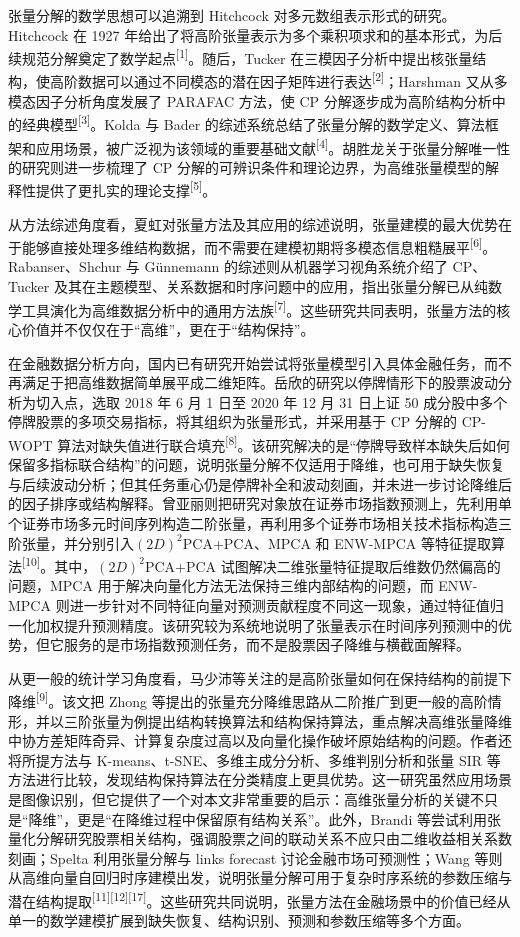 张量分解的数学思想可以追溯到 Hitchcock 对多元数组表示形式的研究。Hitchcock 在 1927 年给出了将高阶张量表示为多个乘积项求和的基本形式，为后续规范分解奠定了数学起点\textsuperscript{[1]}。随后，Tucker 在三模因子分析中提出核张量结构，使高阶数据可以通过不同模态的潜在因子矩阵进行表达\textsuperscript{[2]}；Harshman 又从多模态因子分析角度发展了 PARAFAC 方法，使 CP 分解逐步成为高阶结构分析中的经典模型\textsuperscript{[3]}。Kolda 与 Bader 的综述系统总结了张量分解的数学定义、算法框架和应用场景，被广泛视为该领域的重要基础文献\textsuperscript{[4]}。胡胜龙关于张量分解唯一性的研究则进一步梳理了 CP 分解的可辨识条件和理论边界，为高维张量模型的解释性提供了更扎实的理论支撑\textsuperscript{[5]}。

从方法综述角度看，夏虹对张量方法及其应用的综述说明，张量建模的最大优势在于能够直接处理多维结构数据，而不需要在建模初期将多模态信息粗糙展平\textsuperscript{[6]}。Rabanser、Shchur 与 Günnemann 的综述则从机器学习视角系统介绍了 CP、Tucker 及其在主题模型、关系数据和时序问题中的应用，指出张量分解已从纯数学工具演化为高维数据分析中的通用方法族\textsuperscript{[7]}。这些研究共同表明，张量方法的核心价值并不仅仅在于“高维”，更在于“结构保持”。

在金融数据分析方向，国内已有研究开始尝试将张量模型引入具体金融任务，而不再满足于把高维数据简单展平成二维矩阵。岳欣的研究以停牌情形下的股票波动分析为切入点，选取 2018 年 6 月 1 日至 2020 年 12 月 31 日上证 50 成分股中多个停牌股票的多项交易指标，将其组织为张量形式，并采用基于 CP 分解的 CP-WOPT 算法对缺失值进行联合填充\textsuperscript{[8]}。该研究解决的是“停牌导致样本缺失后如何保留多指标联合结构”的问题，说明张量分解不仅适用于降维，也可用于缺失恢复与后续波动分析；但其任务重心仍是停牌补全和波动刻画，并未进一步讨论降维后的因子排序或结构解释。曾亚丽则把研究对象放在证券市场指数预测上，先利用单个证券市场多元时间序列构造二阶张量，再利用多个证券市场相关技术指标构造三阶张量，并分别引入$(2D)^2$PCA+PCA、MPCA 和 ENW-MPCA 等特征提取算法\textsuperscript{[10]}。其中，$(2D)^2$PCA+PCA 试图解决二维张量特征提取后维数仍然偏高的问题，MPCA 用于解决向量化方法无法保持三维内部结构的问题，而 ENW-MPCA 则进一步针对不同特征向量对预测贡献程度不同这一现象，通过特征值归一化加权提升预测精度。该研究较为系统地说明了张量表示在时间序列预测中的优势，但它服务的是市场指数预测任务，而不是股票因子降维与横截面解释。

从更一般的统计学习角度看，马少沛等关注的是高阶张量如何在保持结构的前提下降维\textsuperscript{[9]}。该文把 Zhong 等提出的张量充分降维思路从二阶推广到更一般的高阶情形，并以三阶张量为例提出结构转换算法和结构保持算法，重点解决高维张量降维中协方差矩阵奇异、计算复杂度过高以及向量化操作破坏原始结构的问题。作者还将所提方法与 K-means、t-SNE、多维主成分分析、多维判别分析和张量 SIR 等方法进行比较，发现结构保持算法在分类精度上更具优势。这一研究虽然应用场景是图像识别，但它提供了一个对本文非常重要的启示：高维张量分析的关键不只是“降维”，更是“在降维过程中保留原有结构关系”。此外，Brandi 等尝试利用张量化分解研究股票相关结构，强调股票之间的联动关系不应只由二维收益相关系数刻画；Spelta 利用张量分解与 links forecast 讨论金融市场可预测性；Wang 等则从高维向量自回归时序建模出发，说明张量分解可用于复杂时序系统的参数压缩与潜在结构提取\textsuperscript{[11][12][17]}。这些研究共同说明，张量方法在金融场景中的价值已经从单一的数学建模扩展到缺失恢复、结构识别、预测和参数压缩等多个方面。

